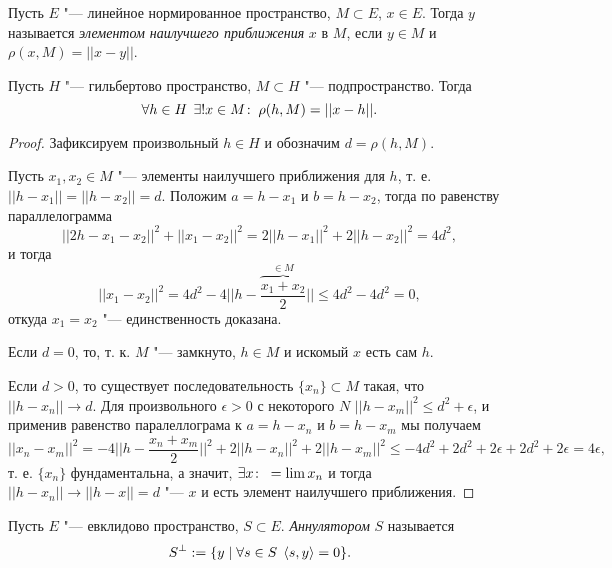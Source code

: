 \documentclass[main]{subfiles}
\begin{document}
\begin{definition}
  Пусть \( E \) "--- линейное нормированное пространство,
  \( M \subset E \),
  \( x \in E \). Тогда \( y \) называется 
  \emph{элементом наилучшего приближения}
  \( x \) в \( M \), если
  \( y \in M \) и \( \rho(x, M) = ||x - y|| \).
\end{definition}

\begin{lemma}
  Пусть \( H \) "--- гильбертово пространство, \( M \subset H \) "---
  подпространство. Тогда
  \[ \forall {h \in H} \; \, \exists! x \in M \colon \: \rho(h, M) = ||x - h||. \]
\end{lemma}
\begin{proof}
  Зафиксируем произвольный \( h \in H \) и обозначим \( d = \rho(h, M) \).

  Пусть \( x_1, x_2 \in M \) "---
  элементы наилучшего приближения для \( h \),
  т. е.  \( ||h - x_1|| = ||h - x_2|| = d \).
  Положим \( a = h - x_1 \) и \( b = h - x_2 \),
  тогда по равенству параллелограмма
  \[ ||2h - x_1 - x_2||^2 + ||x_1 - x_2||^2 =
  2||h - x_1||^2 + 2 ||h - x_2||^2 = 4 d^2, \]
  и тогда
  \[ ||x_1 - x_2||^2 = 4d^2 - 4 ||h - \overbrace{\frac{x_1 + x_2}{2}}^{\in M}||
  \le 4d^2 - 4d^2 = 0, \]
  откуда \( x_1 = x_2 \) "--- единственность доказана.

  Если \( d = 0 \), то, т. к. \( M \) "--- замкнуто,
  \( h \in M \) и искомый \( x \) есть сам \( h \).

  Если \( d > 0 \), то существует последовательность
  \( \{ x_n \} \subset M \) такая, что
  \( ||h - x_n|| \to d \).  Для произвольного \( \epsilon > 0 \)
  с некоторого \( N \) \( ||h - x_m||^2 \le d^2 + \epsilon \),
  и применив равенство паралеллограма
  к \( a = h - x_n \) и \( b = h - x_m \) мы получаем
  \[
    ||x_n - x_m||^2 = -4 ||h - \frac{x_n + x_m}{2}||^2
    + 2 ||h - x_n||^2 + 2||h - x_m||^2 \le
    -4 d^2 + 2d^2 + 2\epsilon + 2d^2 + 2\epsilon =
    4 \epsilon,
  \]
  т. е. \( \{ x_n \} \) фундаментальна, а значит,
  \( \exists x \colon \: = \lim x_n \) и тогда
  \( ||h - x_n|| \to ||h - x|| = d \) "---
  \( x \) и есть элемент наилучшего приближения.
\end{proof}


\begin{definition}
  Пусть \( E \) "--- евклидово пространство, \( S \subset E \).
  \emph{Аннулятором} \( S \) называется
  \[ S^\perp := \{ y \mid \forall {s \in S} \; \, \langle s, y \rangle = 0 \}. \]
\end{definition}
\end{document}
